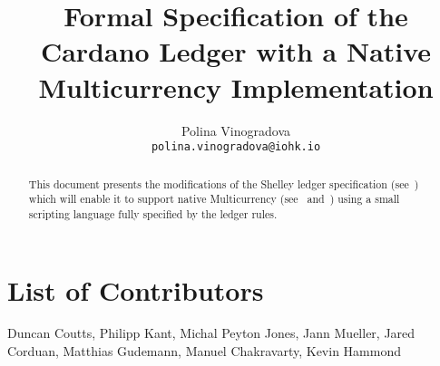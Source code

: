 
\title{Formal Specification of the Cardano Ledger with a Native
Multicurrency Implementation}

\author{
   Polina Vinogradova \\ {\small \texttt{polina.vinogradova@iohk.io}} \\
   }

\date{}

\maketitle

\begin{abstract}
This document presents the modifications of the Shelley ledger
specification
(see~\cite{shelley_spec}) which will enable it to support native
Multicurrency (see~\cite{multi_currency} and~\cite{formal_multicur})
using a small scripting language fully specified
by the ledger rules.
\end{abstract}

\section*{List of Contributors}
\label{acknowledgements}

Duncan Coutts,
Philipp Kant,
Michal Peyton Jones,
Jann Mueller,
Jared Corduan,
Matthias Gudemann,
Manuel Chakravarty,
Kevin Hammond
